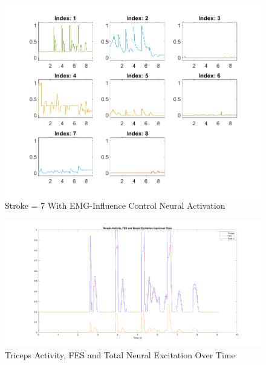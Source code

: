 \begin{figure}[h!]
\centering
\includegraphics[width=1\textwidth]{Pictures/Results/Controller/G(2.99)_G(14.48)_Stroke_7_position_totry(5485).png_ne.jpg} 
\caption{Stroke = 7 With EMG-Influence Control Neural Activation} %
\label{fig:EMGNA} %
\end{figure}

\begin{figure}[h!]
\centering
\includegraphics[width=\textwidth]{Pictures/Results/Controller/FESMuscleExcitations.png}
\caption{Triceps Activity, FES and Total Neural Excitation Over Time} 
\end{figure}

